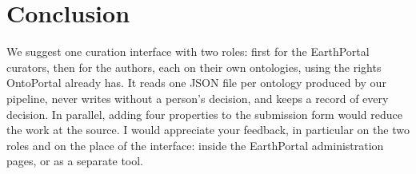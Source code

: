 \documentclass[11pt,a4paper]{article}
\begin{document}
\section{Conclusion}

We suggest one curation interface with two roles: first for the EarthPortal curators, then for the
authors, each on their own ontologies, using the rights OntoPortal already has. It reads one JSON file
per ontology produced by our pipeline, never writes without a person's decision, and keeps a record of
every decision. In parallel, adding four properties to the submission form would reduce the work at the
source. I would appreciate your feedback, in particular on the two roles and on the place of the
interface: inside the EarthPortal administration pages, or as a separate tool.
\end{document}
